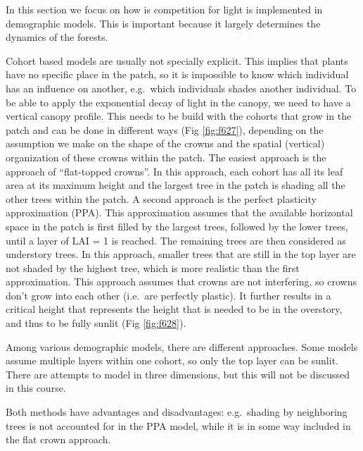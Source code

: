 \documentclass[12pt,oneside]{book}
\begin{document}
In this section we focus on how is competition for light is implemented
in demographic models. This is important because it largely determines
the dynamics of the forests.

Cohort based models are usually not specially explicit. This implies
that plants have no specific place in the patch, so it is impossible to
know which individual has an influence on another, e.g.~which
individuals shades another individual. To be able to apply the
exponential decay of light in the canopy, we need to have a vertical
canopy profile. This needs to be build with the cohorts that grow in the
patch and can be done in different ways (Fig \ref{fig:f627}), depending
on the assumption we make on the shape of the crowns and the spatial
(vertical) organization of these crowns within the patch. The easiest
approach is the approach of ``flat-topped crowns''. In this approach,
each cohort has all its leaf area at its maximum height and the largest
tree in the patch is shading all the other trees within the patch. A
second approach is the perfect plasticity approximation (PPA). This
approximation assumes that the available horizontal space in the patch
is first filled by the largest trees, followed by the lower trees, until
a layer of LAI = 1 is reached. The remaining trees are then considered
as understory trees. In this approach, smaller trees that are still in
the top layer are not shaded by the highest tree, which is more
realistic than the first approximation. This approach assumes that
crowns are not interfering, so crowns don't grow into each other
(i.e.~are perfectly plastic). It further results in a critical height
that represents the height that is needed to be in the overstory, and
thus to be fully sunlit (Fig \ref{fig:f628}).

Among various demographic models, there are different approaches. Some
models assume multiple layers within one cohort, so only the top layer
can be sunlit. There are attempts to model in three dimensions, but this
will not be discussed in this course.

Both methods have advantages and disadvantages: e.g.~shading by
neighboring trees is not accounted for in the PPA model, while it is in
some way included in the flat crown approach.
\end{document}
